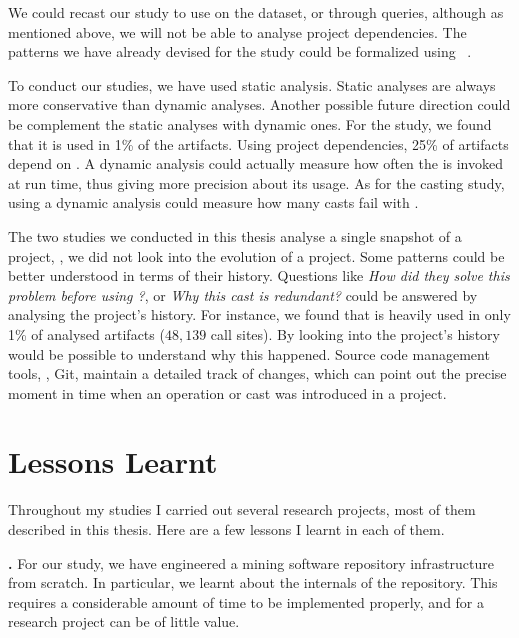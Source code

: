 We could recast our \unsafe{} study to use \boa{} on the \github{} dataset,
or \lgtm{} through \ql{} queries, although as mentioned above,
we will not be able to analyse project dependencies.
The patterns we have already devised for the \unsafe{} study could be formalized using \ql{}~\citep{avgustinovQLObjectorientedQueries2016}.

To conduct our studies, we have used static analysis.
Static analyses are always more conservative than dynamic analyses.
Another possible future direction could be complement the static analyses with dynamic ones.
For the \unsafe{} study,
we found that it is used in 1\% of the \mavencentral{} artifacts.
Using project dependencies, 25\% of artifacts depend on \smu{}.
A dynamic analysis could actually measure how often the \unsafe{} \api{} is invoked at run time,
thus giving more precision about its usage.
As for the casting study,
using a dynamic analysis could measure how many casts fail with .

The two studies we conducted in this thesis analyse a single snapshot of a project,
\ie{}, we did not look into the evolution of a project.
Some patterns could be better understood in terms of their history.
Questions like
\emph{How did they solve this problem before using \unsafe{}?},
or \emph{Why this cast is redundant?}
could be answered by analysing the project's history. 
For instance,
we found that \smu{} is heavily used in only 1\% of analysed artifacts
($48,139$ call sites).
By looking into the project's history would be possible to understand why this happened.
Source code management tools, \eg{}, Git,
maintain a detailed track of changes,
which can point out the precise moment in time when an \unsafe{} operation or cast was introduced in a project.

\section{Lessons Learnt}

Throughout my \phd{} studies I carried out several research projects,
most of them described in this thesis.
Here are a few lessons I learnt in each of them.

\textbf{\unsafe{} \api{}.}
For our \unsafe{} study,
we have engineered a mining software repository infrastructure from scratch.
In particular,
we learnt about the internals of the \mavencentral{} repository.
This requires a considerable amount of time to be implemented properly,
and for a research project can be of little value.

